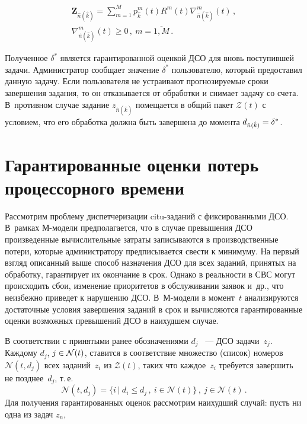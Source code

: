 \begin{multicols}{2}
\begin{enumerate}[(1)]
\vspace*{-18pt}

\begin{multline*}
\mathbf{Z}_{\hat n(\hat{k})} =  \sum\limits_{ m = 1}^{M} p_{\hat{k}}^m(t) R^m(t)  
\nabla_{\hat n{(\hat{k})}} ^m (t )\,, \\
\nabla_{\hat n(\hat k)}^m (t ) \ge 0\,,\   m = \overline {1, M}\,.
\end{multline*}
\end{enumerate}

Полученное $\delta ^*$ является гарантированной оценкой ДСО для вновь поступившей 
задачи. Администратор сообщает значение $\delta ^*$ пользователю, который предоставил 
данную задачу. Если пользователя не устраивают прогнозируемые сроки завершения задания, 
то он отказывается от обработки и снимает задачу со счета. В~противном случае  
задание $z_{\hat n(\hat{k})}$ помещается в общий пакет $\mathcal{Z}(t)$ с условием, 
что его обработка должна быть завершена до момента $d_{\hat n{(\hat{k})}} \hm= \delta ^*$.

\section{Гарантированные оценки потерь процессорного времени}

Рассмотрим проблему диспетчеризации citu-за\-да\-ний с фиксированными ДСО. 
В~рамках М-мо\-де\-ли предполагается, что в случае превышения ДСО произведенные 
вычислительные затраты записываются в производственные потери, которые администратору 
предписывается свести к минимуму.
На первый взгляд описанный выше способ назначения ДСО для всех заданий, принятых на обработку, 
гарантирует их окончание в срок. Однако в реальности в СВС могут происходить сбои, изменение 
приоритетов в обслуживании заявок и~др., что неизбежно приведет к нарушению ДСО.  
В~М-мо\-де\-ли в момент~$t$ анализируются достаточные условия завершения заданий  в 
срок и вычисляются гарантированные оценки возможных превышений ДСО в наихудшем случае.

В соответствии с принятыми ранее обозначениями $d_j$~ --- ДСО задачи~$z_j$. 
Каж\-до\-му   $d_j$, $j \hm\in \mathcal{N}(t)$, ставится  в соответствие
множество (список) номеров  $\mathcal{N}(t, d_j)$  всех заданий~$z_i$ из
$\mathcal{Z}(t)$, таких что каж\-дое~$z_i$ требуется завершить не позднее~$d_j$, т.\,е.
$$
\mathcal{N}(t, d_j) = \{ i \ \vert  \ d_i \le d_j\,, \  i \in  \mathcal{N}(t) \}\,,\ j \in \mathcal{N}(t)\,.   
$$
Для получения гарантированных оценок рас\-смот\-рим наихудший случай: пусть ни одна из 
задач  $z_n$,\linebreak\vspace*{-12pt}


\end{multicols}
